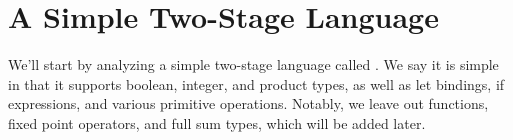 \documentclass{article}
\begin{document}
%
%
%
%
%

\section{A Simple Two-Stage Language}

We'll start by analyzing a simple two-stage language called \corelang.  We say it is simple in that it supports boolean, integer, and product types, as well as let bindings, if expressions, and various primitive operations.  Notably, we leave out functions, fixed point operators, and full sum types, which will be added later.
\end{document}
